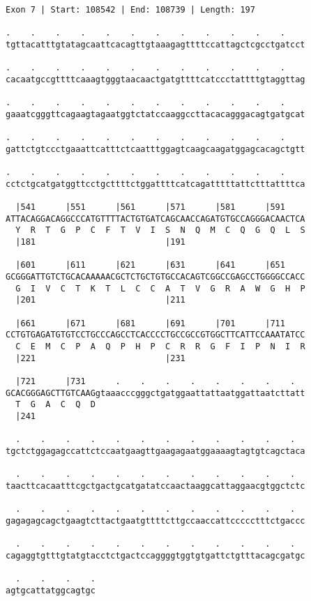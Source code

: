 \documentclass{article}
\begin{document}
\begin{Verbatim}
Exon 7 | Start: 108542 | End: 108739 | Length: 197
 
.    .    .    .    .    .    .    .    .    .    .    .    
tgttacatttgtatagcaattcacagttgtaaagagttttccattagctcgcctgatcct
  
.    .    .    .    .    .    .    .    .    .    .    .    
cacaatgccgttttcaaagtgggtaacaactgatgttttcatccctattttgtaggttag
  
.    .    .    .    .    .    .    .    .    .    .    .    
gaaatcgggttcagaagtagaatggtctatccaaggccttacacagggacagtgatgcat
  
.    .    .    .    .    .    .    .    .    .    .    .    
gattctgtccctgaaattcatttctcaatttggagtcaagcaagatggagcacagctgtt
  
.    .    .    .    .    .    .    .    .    .    .    .    
cctctgcatgatggttcctgcttttctggattttcatcagatttttattctttattttca
  
  |541      |551      |561      |571      |581      |591    
ATTACAGGACAGGCCCATGTTTTACTGTGATCAGCAACCAGATGTGCCAGGGACAACTCA
  Y  R  T  G  P  C  F  T  V  I  S  N  Q  M  C  Q  G  Q  L  S
  |181                          |191                        
  
  |601      |611      |621      |631      |641      |651    
GCGGGATTGTCTGCACAAAAACGCTCTGCTGTGCCACAGTCGGCCGAGCCTGGGGCCACC
  G  I  V  C  T  K  T  L  C  C  A  T  V  G  R  A  W  G  H  P
  |201                          |211                        
  
  |661      |671      |681      |691      |701      |711    
CCTGTGAGATGTGTCCTGCCCAGCCTCACCCCTGCCGCCGTGGCTTCATTCCAAATATCC
  C  E  M  C  P  A  Q  P  H  P  C  R  R  G  F  I  P  N  I  R
  |221                          |231                        
  
  |721      |731      .    .    .    .    .    .    .    .  
GCACGGGAGCTTGTCAAGgtaaacccgggctgatggaattattaatggattaatcttatt
  T  G  A  C  Q  D                                          
  |241                                                      
  
  .    .    .    .    .    .    .    .    .    .    .    .  
tgctctggagagccattctccaatgaagttgaagagaatggaaaagtagtgtcagctaca
  
  .    .    .    .    .    .    .    .    .    .    .    .  
taacttcacaatttcgctgactgcatgatatccaactaaggcattaggaacgtggctctc
  
  .    .    .    .    .    .    .    .    .    .    .    .  
gagagagcagctgaagtcttactgaatgttttcttgccaaccattccccctttctgaccc
  
  .    .    .    .    .    .    .    .    .    .    .    .  
cagaggtgtttgtatgtacctctgactccaggggtggtgtgattctgtttacagcgatgc
  
  .    .    .    .
agtgcattatggcagtgc
\end{Verbatim}
\end{document}
